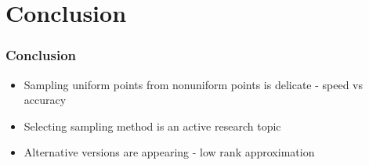 \documentclass{beamer}
\begin{document}

\section{Conclusion}
\begin{frame}
  \frametitle{Conclusion}

  \begin{itemize}
      \item Sampling uniform points from nonuniform points is delicate - speed vs accuracy
      \item Selecting sampling method is an active research topic
      \item Alternative versions are appearing - low rank approximation
  \end{itemize}

\end{frame}
\end{document}
